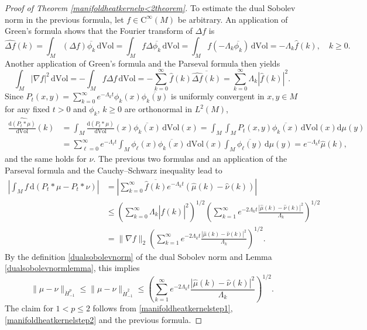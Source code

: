 \documentclass[11pt,a4paper]{article}
\theoremstyle{definition}
\begin{document}
\begin{proof}[Proof of Theorem \ref{manifoldheatkernelp<2theorem}]
To estimate the dual Sobolev norm in the previous formula, let $f \in \mathrm{C}^{\infty}(M)$ be arbitrary. An application of Green's formula shows that the Fourier transform of $\Delta f$ is
\[ \widehat{\Delta f}(k) = \int_M (\Delta f) \overline{\phi_k} \, \mathrm{d} \mathrm{Vol} = \int_M f \Delta \overline{\phi_k} \, \mathrm{d}\mathrm{Vol} = \int_M f (-\Lambda_k \overline{\phi_k}) \, \mathrm{d}\mathrm{Vol} = - \Lambda_k \widehat{f}(k), \quad k \ge 0. \]
Another application of Green's formula and the Parseval formula then yields
\[ \int_M |\nabla f|^2 \, \mathrm{d}\mathrm{Vol} = - \int_M f \Delta f \, \mathrm{d} \mathrm{Vol} = - \sum_{k=0}^{\infty} \widehat{f}(k) \overline{\widehat{\Delta f}(k)} = \sum_{k=0}^{\infty} \Lambda_k |\widehat{f}(k)|^2 . \]
Since $P_t(x,y) = \sum_{k=0}^{\infty} e^{-\Lambda_k t} \phi_k(x) \overline{\phi_k(y)}$ is uniformly convergent in $x,y \in M$ for any fixed $t>0$ and $\phi_k$, $k \ge 0$ are orthonormal in $L^2(M)$,
\[ \begin{split} \widehat{\frac{\mathrm{d}(P_t * \mu)}{\mathrm{d}\mathrm{Vol}}}(k) &= \int_M \frac{\mathrm{d}(P_t * \mu)}{\mathrm{d}\mathrm{Vol}} (x) \overline{\phi_k(x)} \, \mathrm{d}\mathrm{Vol}(x) = \int_M \int_M P_t(x,y) \overline{\phi_k(x)} \, \mathrm{d} \mathrm{Vol}(x) \mathrm{d}\mu (y) \\ &=\sum_{\ell=0}^{\infty} e^{-\Lambda_{\ell} t} \int_M \phi_{\ell}(x) \overline{\phi_k (x)} \, \mathrm{d}\mathrm{Vol}(x) \int_M \overline{\phi_{\ell}(y)} \, \mathrm{d}\mu(y) = e^{-\Lambda_k t} \widehat{\mu}(k), \end{split} \]
and the same holds for $\nu$. The previous two formulas and an application of the Parseval formula and the Cauchy--Schwarz inequality lead to
\[ \begin{split} \left| \int_M f \, \mathrm{d}(P_t * \mu - P_t * \nu) \right| &= \left| \sum_{k=0}^{\infty} \overline{\widehat{f}(k)} e^{-\Lambda_k t} (\widehat{\mu}(k) - \widehat{\nu}(k)) \right| \\ &\le \left( \sum_{k=0}^{\infty} \Lambda_k |\widehat{f}(k)|^2 \right)^{1/2} \left( \sum_{k=1}^{\infty} e^{-2 \Lambda_k t} \frac{|\widehat{\mu}(k) - \widehat{\nu}(k)|^2}{\Lambda_k} \right)^{1/2} \\ &= \| \nabla f \|_2 \left( \sum_{k=1}^{\infty} e^{-2 \Lambda_k t} \frac{|\widehat{\mu}(k) - \widehat{\nu}(k)|^2}{\Lambda_k} \right)^{1/2} . \end{split} \]
By the definition \eqref{dualsobolevnorm} of the dual Sobolev norm and Lemma \ref{dualsobolevnormlemma}, this implies
\[ \| \mu - \nu \|_{\dot{H}_{-1}^p} \le \| \mu - \nu \|_{\dot{H}_{-1}^2} \le \left( \sum_{k=1}^{\infty} e^{-2 \Lambda_k t} \frac{|\widehat{\mu}(k) - \widehat{\nu}(k)|^2}{\Lambda_k} \right)^{1/2} . \]
The claim for $1<p \le 2$ follows from \eqref{manifoldheatkernelstep1}, \eqref{manifoldheatkernelstep2} and the previous formula.


\end{proof}
\end{document}

